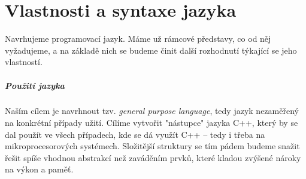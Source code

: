 \begin{comment}
Mou hlavní motivací je nespokojenost se stávajícími programovacími jazyky. Programování mám jako koníčka už od nějakých dvanácti let, a tak jsem ještě před nastoupením na FIT získal nějaké zkušenosti z psaní aplikací v Object Pascalu (Delphi), C++ (Qt, SDL + OpenGL) a PHP (webové aplikace). FIT pak můj repertoár (i když jen rámcově) rozšířil na valnou většinu dnes používaných jazyků. Bohužel jsem ale nenarazil na žádný, který by splňoval mé požadavky. Rozhodl jsem se tedy využít nutnost napsání bakalářské práce k~uskutečnění mého dlouholetého snu.

\paragraph{Jazyk D}
Mému srdci nejbližší jazyk, na který jsem ve svém pátrání narazil, byl jazyk D. Jedná se o kompilovaný jazyk vycházející z C++ (binárky jsou do jisté míry kompatibilní) s~velice podobnou syntaxí. Největší rozdíly jsou modulový systém\footnote{\url{http://dlang.org/spec/module.html}} (zdrojový kód je rozdělen do modulů, které se vzájemně, i rekurzivně, importují; odpadá nutnost psát hlavičkové soubory), značně rozšířená funkčnost metaprogramování s šablonami a~rozšířená schopnost vykonávat funkce za doby kompilace.

D mi byl velikou inspirací při navrhování mého jazyka. Bohužel i v D jsem narazil na strop možnosti (ačkoli byl značně výš než třeba v C++), kdy některé věci nešly napsat tak jednoduše, jak bych chtěl. Tento jazyk však dokazuje, že tato bariéra může být mnohem dál. Já ji chci ve svém jazyku ještě více posunout. 
\end{comment}

\chapter{Vlastnosti a syntaxe jazyka}
Navrhujeme programovací jazyk. Máme už rámcové představy, co od něj vyžadujeme, a na základě nich se budeme činit další rozhodnutí týkající se jeho vlastností.

\paragraph{Použití jazyka}
Naším cílem je navrhnout tzv. \textit{general purpose language}, tedy jazyk nezaměřený na konkrétní případy užití. Cílíme vytvořit "nástupce" jazyka C++, který by se dal použít ve všech případech, kde se dá využít C++ -- tedy i třeba na mikroprocesorových systémech. Složitější struktury se tím pádem budeme snažit řešit spíše vhodnou abstrakcí než zaváděním prvků, které kladou zvýšené nároky na výkon a paměť.

